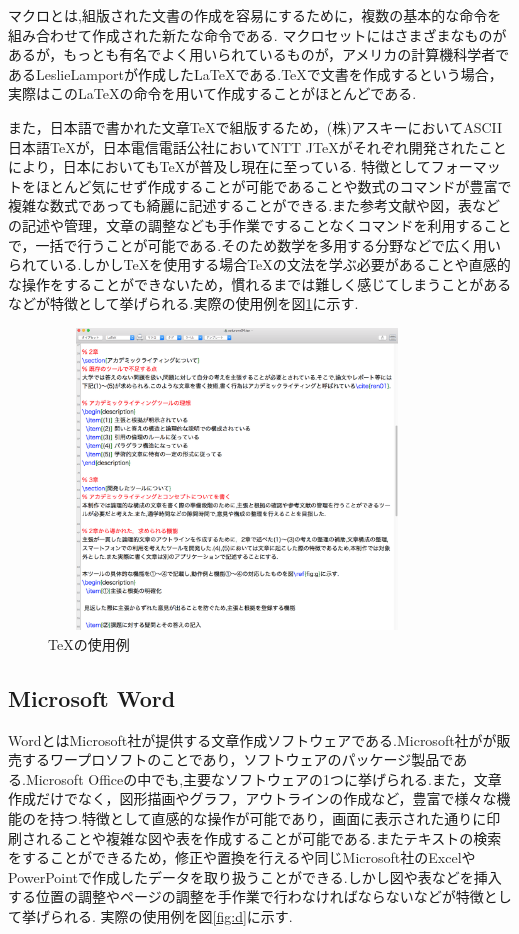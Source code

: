 \documentclass[a4j,12pt]{jarticle}
\begin{document}
マクロとは,組版された文書の作成を容易にするために，複数の基本的な命令を組み合わせて作成された新たな命令である.
マクロセットにはさまざまなものがあるが，もっとも有名でよく用いられているものが，アメリカの計算機科学者であるLeslieLamportが作成した\LaTeX である.\TeX で文書を作成するという場合，実際はこの\LaTeX の命令を用いて作成することがほとんどである.

また，日本語で書かれた文章\TeX で組版するため，(株)アスキーにおいてASCII日本語\TeX が，日本電信電話公社においてNTT J\TeX がそれぞれ開発されたことにより，日本においても\TeX が普及し現在に至っている\cite{ren3}.
特徴としてフォーマットをほとんど気にせず作成することが可能であることや数式のコマンドが豊富で複雑な数式であっても綺麗に記述することができる.また参考文献や図，表などの記述や管理，文章の調整なども手作業ですることなくコマンドを利用することで，一括で行うことが可能である.そのため数学を多用する分野などで広く用いられている.しかし\TeX を使用する場合\TeX の文法を学ぶ必要があることや直感的な操作をすることができないため，慣れるまでは難しく感じてしまうことがあるなどが特徴として挙げられる.実際の使用例を図\ref{fig:c}に示す.

\begin{figure}[H]
\begin{center}
 \includegraphics[clip,width=100mm,height=80mm]{figure/TEX.png}
 \end{center}
 \caption{\TeX の使用例}
 \label{fig:c}
\end{figure}

\subsection{Microsoft Word}
WordとはMicrosoft社が提供する文章作成ソフトウェアである.Microsoft社がが販売するワープロソフトのことであり，ソフトウェアのパッケージ製品である.Microsoft Officeの中でも,主要なソフトウェアの1つに挙げられる.また，文章作成だけでなく，図形描画やグラフ，アウトラインの作成など，豊富で様々な機能のを持つ.特徴として直感的な操作が可能であり，画面に表示された通りに印刷されることや複雑な図や表を作成することが可能である.またテキストの検索をすることができるため，修正や置換を行えるや同じMicrosoft社のExcelやPowerPointで作成したデータを取り扱うことができる.しかし図や表などを挿入する位置の調整やページの調整を手作業で行わなければならないなどが特徴として挙げられる.
実際の使用例を図\ref{fig:d}に示す.
\end{document}
